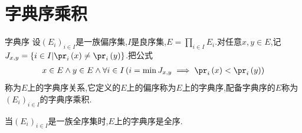 \section{字典序乘积}

\begin{definition}{字典序}{}
	设$\left(E_{i}\right)_{i\in I}$是一族偏序集,$I$是良序集,$E=\prod\limits_{i\in I}E_{i}$.对任意$x,y\in E$,记$J_{x,y}=\left\{i\in I\middle|\pr_{i}\left(x\right)\neq\pr_{i}\left(y\right)\right\}$.把公式
	\begin{align*}
		x\in E\wedge y\in E\wedge\forall i\in I\left(i=\min J_{x,y}\implies\pr_{i}\left(x\right)<\pr_{i}\left(y\right)\right)
	\end{align*}
	称为$E$上的字典序关系,它定义的$E$上的偏序称为$E$上的字典序,配备字典序的$E$称为$\left(E_{i}\right)_{i\in I}$的字典序乘积.
\end{definition}

\begin{remark}{}{}
	当$\left(E_{i}\right)_{i\in I}$是一族全序集时,$E$上的字典序是全序.
\end{remark}



























